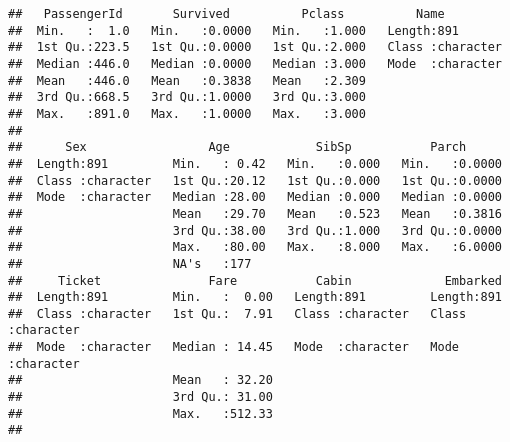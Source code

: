 \documentclass[
]{article}
\newenvironment{Shaded}{\begin{snugshade}}{\end{snugshade}}
\newcommand{\CommentTok}[1]{\textcolor[rgb]{0.56,0.35,0.01}{\textit{#1}}}
\newcommand{\DocumentationTok}[1]{\textcolor[rgb]{0.56,0.35,0.01}{\textbf{\textit{#1}}}}
\newcommand{\FunctionTok}[1]{\textcolor[rgb]{0.00,0.00,0.00}{#1}}
\newcommand{\NormalTok}[1]{#1}
\newcommand{\OtherTok}[1]{\textcolor[rgb]{0.56,0.35,0.01}{#1}}
\newcommand{\SpecialCharTok}[1]{\textcolor[rgb]{0.00,0.00,0.00}{#1}}
\newcommand{\StringTok}[1]{\textcolor[rgb]{0.31,0.60,0.02}{#1}}
\begin{document}
\begin{verbatim}
##   PassengerId       Survived          Pclass          Name          
##  Min.   :  1.0   Min.   :0.0000   Min.   :1.000   Length:891        
##  1st Qu.:223.5   1st Qu.:0.0000   1st Qu.:2.000   Class :character  
##  Median :446.0   Median :0.0000   Median :3.000   Mode  :character  
##  Mean   :446.0   Mean   :0.3838   Mean   :2.309                     
##  3rd Qu.:668.5   3rd Qu.:1.0000   3rd Qu.:3.000                     
##  Max.   :891.0   Max.   :1.0000   Max.   :3.000                     
##                                                                     
##      Sex                 Age            SibSp           Parch       
##  Length:891         Min.   : 0.42   Min.   :0.000   Min.   :0.0000  
##  Class :character   1st Qu.:20.12   1st Qu.:0.000   1st Qu.:0.0000  
##  Mode  :character   Median :28.00   Median :0.000   Median :0.0000  
##                     Mean   :29.70   Mean   :0.523   Mean   :0.3816  
##                     3rd Qu.:38.00   3rd Qu.:1.000   3rd Qu.:0.0000  
##                     Max.   :80.00   Max.   :8.000   Max.   :6.0000  
##                     NA's   :177                                     
##     Ticket               Fare           Cabin             Embarked        
##  Length:891         Min.   :  0.00   Length:891         Length:891        
##  Class :character   1st Qu.:  7.91   Class :character   Class :character  
##  Mode  :character   Median : 14.45   Mode  :character   Mode  :character  
##                     Mean   : 32.20                                        
##                     3rd Qu.: 31.00                                        
##                     Max.   :512.33                                        
## 
\end{verbatim}

\begin{Shaded}
\end{Shaded}
\end{document}
